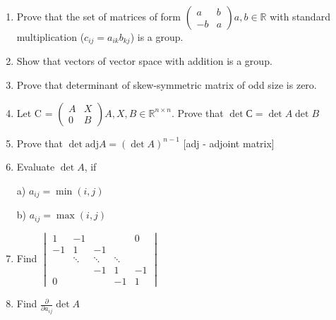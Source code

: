 \documentclass{article}
\begin{document}
 	\begin{enumerate}
 		\item Prove that the set of matrices of form  $\left(\begin{matrix}a & b\\ -b & a\end{matrix}\right) a,b \in \mathbb{R}$ with standard multiplication ($c_{ij} = a_{ik} b_{kj}$) is a group.
 		\item Show that vectors of vector space with addition is a group.
 		\item Prove that determinant of skew-symmetric matrix of odd size is zero.
 		
 		\item Let C = $\left(\begin{matrix}A & X\\ 0 & B\end{matrix}\right) A,X, B \in \mathbb{R}^{n \times n}$. Prove that $\det С = \det A \det B$
 		
 		\item Prove that $\det \text{adj} A = (\det A)^{n-1}$ [adj - adjoint matrix]
 		
 		\item Evaluate  $\det A$, if
 		
 		a) $a_{ij} = \min(i,j)$
 		
 		b) $a_{ij} = \max(i,j)$ 
 		
 		\item Find $ \begin{vmatrix}
 		1 & -1 &    &    & 0   \\
 		-1  & 1       & -1   &      &    \\
 		&       \ddots &           \ddots&     \ddots      &    \\
 		&         &           -1&          1 & -1\\
 		0  &         &           &          -1 & 1
 		\end{vmatrix}
 		$
 		
 		\item Find $\frac{\partial} {\partial a_{ij}} \det A$
 	\end{enumerate}
	
 	
 
\end{document}

